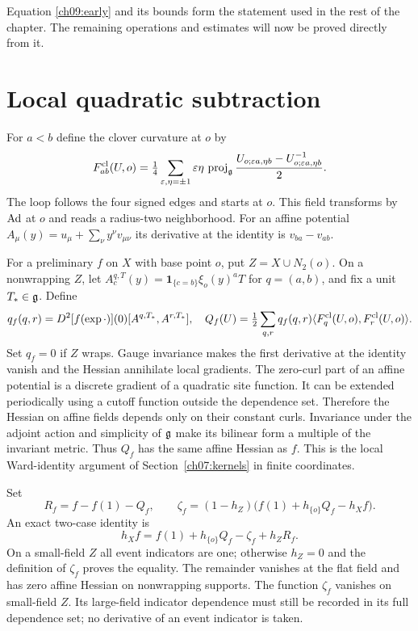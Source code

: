 Equation \eqref{ch09:early} and its bounds form the statement
used in the rest of the chapter. The remaining
operations and estimates will now be proved directly from it.

\section{Local quadratic subtraction}
\label{ch09:subtraction}

For $a<b$ define the clover curvature at $o$ by
\[
 F^{\rm cl}_{ab}(U,o)=\tfrac14\sum_{\varepsilon,\eta=\pm1}
 \varepsilon\eta\,\operatorname{proj}_{\mathfrak g}
       \frac{U_{o;\varepsilon a,\eta b}
                         -U_{o;\varepsilon a,\eta b}^{-1}}2 .
\]
The loop follows the four signed edges and starts at $o$.
This field transforms by $\operatorname{Ad}$ at $o$ and reads a radius-two
neighborhood. For an affine potential
$A_\mu(y)=u_\mu+\sum_\nu y^\nu v_{\mu\nu}$ its derivative
at the identity is $v_{ba}-v_{ab}$.

For a preliminary $f$ on $X$ with base point $o$, put
$Z=X\cup N_2(o)$. On a nonwrapping $Z$, let
$A^{q,T}_c(y)=\mathbf1_{\{c=b\}}\xi_o(y)^aT$ for $q=(a,b)$,
and fix a unit $T_*\in\mathfrak g$. Define
\[
 q_f(q,r)=D^2[f(\exp\cdot)](0)[A^{q,T_*},A^{r,T_*}],
 \quad
 Q_f(U)=\tfrac12\sum_{q,r}q_f(q,r)
       \langle F^{\rm cl}_q(U,o),F^{\rm cl}_r(U,o)\rangle.
\]
Set $q_f=0$ if $Z$ wraps. Gauge invariance makes the first
derivative at the identity vanish and the Hessian annihilate
local gradients. The zero-curl part of an affine potential
is a discrete gradient of a quadratic site function.
It can be extended periodically using a cutoff function outside
the dependence set. Therefore the Hessian on affine fields
depends only on their constant curls. Invariance under the adjoint action and simplicity of $\mathfrak g$ make its
bilinear form a multiple of the invariant metric.
Thus $Q_f$ has the same affine Hessian as $f$.
This is the local Ward-identity argument of
Section~\ref{ch07:kernels} in finite coordinates.

Set
\[
 R_f=f-f(1)-Q_f,\qquad
 \zeta_f=(1-h_Z)\bigl(f(1)+h_{\{o\}}Q_f-h_Xf\bigr).
\]
An exact two-case identity is
\begin{equation}
 h_Xf=f(1)+h_{\{o\}}Q_f-\zeta_f+h_ZR_f .
 \label{ch09:subtract-identity}
\end{equation}
On a small-field $Z$ all event indicators are one; otherwise $h_Z=0$
and the definition of $\zeta_f$ proves the equality.
The remainder vanishes at the flat field and has zero
affine Hessian on nonwrapping supports.
The function $\zeta_f$ vanishes on small-field $Z$.
Its large-field indicator dependence must still be recorded in its full
dependence set; no derivative of an event indicator is taken.

